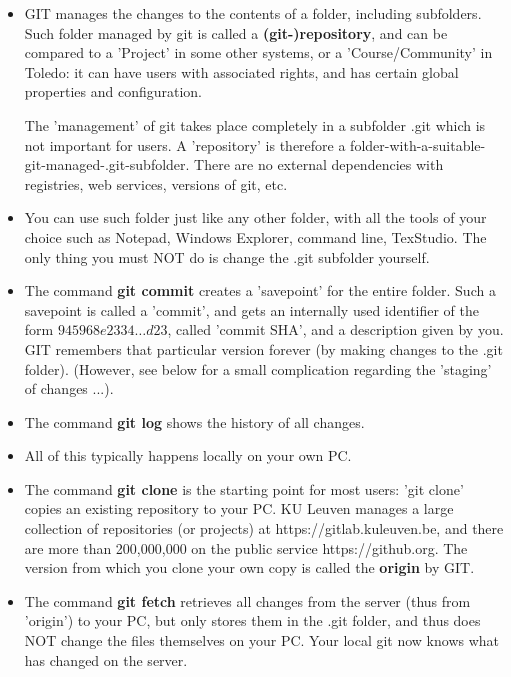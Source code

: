\documentclass{ximera}
\begin{document}
\begin{itemize}
\item GIT manages the changes to the contents of a folder, including subfolders. Such folder managed by git is called a \textbf{(git-)repository}, and can be compared to a 'Project' in some other systems, or a 'Course/Community' in Toledo: it can have users with associated rights, and has certain global properties and configuration.

The 'management' of git takes place completely in a subfolder .git which is not important for users. A 'repository' is therefore a folder-with-a-suitable-git-managed-.git-subfolder. There are no external dependencies with registries, web services, versions of git, etc.

\item You can use such folder just like any other folder, with all the tools of your choice such as Notepad, Windows Explorer, command line, TexStudio. The only thing you must NOT do is change the .git subfolder yourself.

\item The command \textbf{git commit} creates a 'savepoint' for the entire folder. Such a savepoint is called a 'commit', and gets an internally used identifier of the form $945968e2334\ldots d23$, called 'commit SHA', and a description given by you. GIT remembers that particular version forever (by making changes to the .git folder). (However, see below for a small complication regarding the 'staging' of changes ...).

\item The command \textbf{git log} shows the history of all changes.

\item All of this typically happens locally on your own PC.

\item The command \textbf{git clone} is the starting point for most users: 'git clone' copies an existing repository to your PC. KU Leuven manages a large collection of repositories (or projects) at https://gitlab.kuleuven.be, and there are more than 200,000,000 on the public service https://github.org. The version from which you clone your own copy is called the \textbf{origin} by GIT.

\item The command \textbf{git fetch} retrieves all changes from the server (thus from 'origin') to your PC, but only stores them in the .git folder, and thus does NOT change the files themselves on your PC. Your local git now knows what has changed on the server.


\end{itemize}
\end{document}
